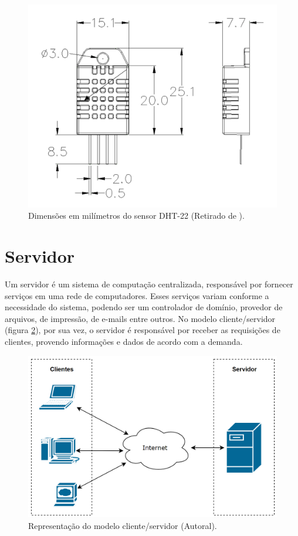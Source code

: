 \begin{figure}[H]
  \centering
  \includegraphics[width=.80\textwidth]{assets/dht-22.png} 
  \caption{Dimensões em milímetros do sensor DHT-22 (Retirado de \cite{datasheetDHT22}).}
  \label{fig:dht-22} 
\end{figure}

\section{Servidor}
\label{fund:servidor}
Um servidor é um sistema de computação centralizada, responsável por fornecer serviços em uma rede de computadores. Esses serviços variam conforme a necessidade do sistema, podendo ser um controlador de domínio, provedor de arquivos, de impressão, de e-mails entre outros. No modelo cliente/servidor (figura \ref{fig:client-server-model}), por sua vez, o servidor é responsável por receber as requisições de clientes, provendo informações e dados de acordo com a demanda.

\begin{figure}[H]
  \centering
  \includegraphics[width=.80\textwidth]{assets/client-server-model.png} 
  \caption{Representação do modelo cliente/servidor (Autoral).}
  \label{fig:client-server-model} 
\end{figure}

